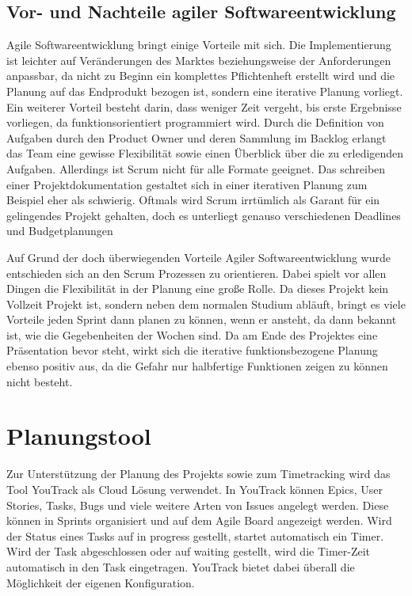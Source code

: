 \subsection{Vor- und Nachteile agiler Softwareentwicklung}

Agile Softwareentwicklung bringt einige Vorteile mit sich. Die Implementierung ist leichter auf Veränderungen des Marktes beziehungsweise der Anforderungen anpassbar, da nicht zu Beginn ein komplettes Pflichtenheft erstellt wird und die Planung auf das Endprodukt bezogen ist, sondern eine iterative Planung vorliegt. Ein weiterer Vorteil besteht darin, dass weniger Zeit vergeht, bis erste Ergebnisse vorliegen, da funktionsorientiert programmiert wird. Durch die Definition von Aufgaben durch den Product Owner und deren Sammlung im Backlog erlangt das Team eine gewisse Flexibilität sowie einen Überblick über die zu erledigenden Aufgaben.
Allerdings ist Scrum nicht für alle Formate geeignet. Das schreiben einer Projektdokumentation gestaltet sich in einer iterativen Planung zum Beispiel eher als schwierig. Oftmals wird Scrum irrtümlich als Garant für ein gelingendes Projekt gehalten, doch es unterliegt genauso verschiedenen Deadlines und Budgetplanungen ~\cite{F_Agile_2.1}

Auf Grund der doch überwiegenden Vorteile Agiler Softwareentwicklung wurde entschieden sich an den Scrum Prozessen zu orientieren. Dabei spielt vor allen Dingen die Flexibilität in der Planung eine große Rolle. Da dieses Projekt kein Vollzeit Projekt ist, sondern neben dem normalen Studium abläuft, bringt es viele Vorteile jeden Sprint dann planen zu können, wenn er ansteht, da dann bekannt ist, wie die Gegebenheiten der Wochen sind. Da am Ende des Projektes eine Präsentation bevor steht, wirkt sich die iterative funktionsbezogene Planung ebenso positiv aus, da die Gefahr nur halbfertige Funktionen zeigen zu können nicht besteht. 


\section{Planungstool}

Zur Unterstützung der Planung des Projekts sowie zum Timetracking wird das Tool YouTrack als Cloud Lösung verwendet. In YouTrack können Epics, User Stories, Tasks, Bugs und viele weitere Arten von Issues angelegt werden. Diese können in Sprints organisiert und auf dem Agile Board angezeigt werden. Wird der Status eines Tasks auf \glqq in progress\grqq{} gestellt, startet automatisch ein Timer. Wird der Task abgeschlossen oder auf \glqq waiting \grqq{} gestellt, wird die Timer-Zeit automatisch in den Task eingetragen. YouTrack bietet dabei überall die Möglichkeit der eigenen Konfiguration.

